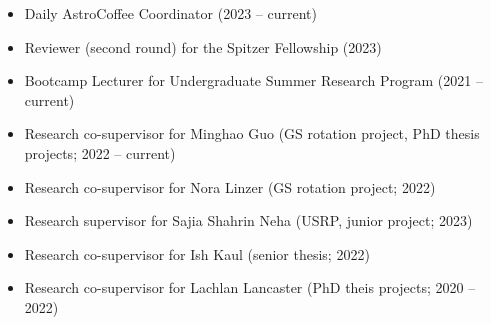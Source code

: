 \documentclass[12pt]{article}
\begin{document}
\begin{itemize}
    \item Daily AstroCoffee Coordinator (2023 -- current)
    \item Reviewer (second round) for the Spitzer Fellowship (2023)
    \item Bootcamp Lecturer for Undergraduate Summer Research Program (2021 -- current)
    \item Research co-supervisor for Minghao Guo (GS rotation project, PhD thesis projects; 2022 -- current)
    \item Research co-supervisor for Nora Linzer (GS rotation project; 2022)
    \item Research supervisor for Sajia Shahrin Neha (USRP, junior project; 2023)
    \item Research co-supervisor for Ish Kaul (senior thesis; 2022)
    \item Research co-supervisor for Lachlan Lancaster (PhD theis projects; 2020 -- 2022)
\end{itemize}
\end{document}
